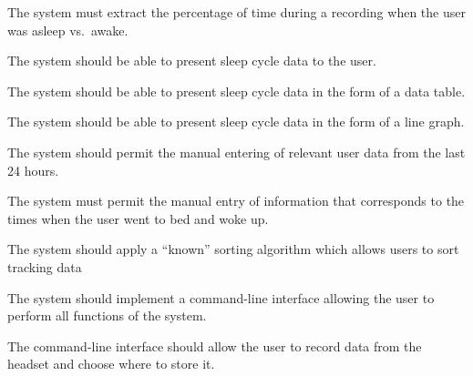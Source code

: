 \begin{reqtable}
  {The system must extract the percentage of time during a recording when the user was asleep vs.\
    awake.}
  \phigh
  \deps{\ref{sreq:calculate-moving-average}}

  {The system should be able to present sleep cycle data to the user.}
  \phigh
  \deps{\ref{sreq:present-data-table},\ref{sreq:present-hypnogram}}

  {The system should be able to present sleep cycle data in the form of a data table.}
  \phigh
  \deps{\ref{req:extract-data}}

  {The system should be able to present sleep cycle data in the form of a line graph.}
  \phigh
  \deps{\ref{req:extract-data}}

  {The system should permit the manual entering of relevant user data from the last 24 hours.}
  \pmed
  \deps{\ref{req:manual-entry-bed-woke}}

  {The system must permit the manual entry of information that corresponds to the times when the
    user went to bed and woke up.}
  \pmed
  \dnone

  {The system should apply a ``known'' sorting algorithm which allows users to sort tracking data}
  \pmed
  \deps{\ref{req:store-data}}
  \sspec

  {The system should implement a command-line interface allowing the user to perform all functions
    of the system.}
  \phigh
  \deps{\ref{sreq:allow-user-record-data}, \ref{sreq:specify-time-record},
    \ref{sreq:allow-user-change-format}, \ref{sreq:allow-user-extract-calculate},
    \ref{sreq:cli-sort-display}}

  {The command-line interface should allow the user to record data from the headset and choose where
    to store it.}
  \phigh
  \deps{\ref{sreq:read-data-headset}, \ref{sreq:facilitate-saving}}
  \smin{13}


\end{reqtable}
